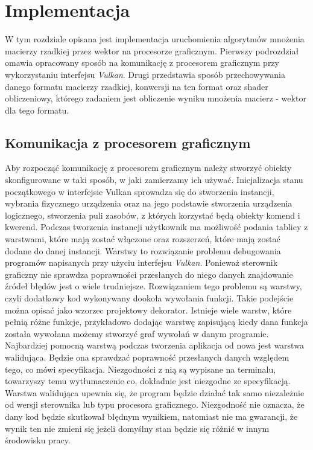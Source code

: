 \chapter{Implementacja}
\label{cha:implementacja}

W tym rozdziale opisana jest implementacja uruchomienia algorytmów mnożenia macierzy rzadkiej przez wektor na procesorze graficznym.
Pierwszy podrozdział omawia opracowany sposób na komunikację z procesorem graficznym przy wykorzystaniu interfejsu \textit{Vulkan}.
Drugi przedstawia sposób przechowywania danego formatu macierzy rzadkiej, konwersji na ten format oraz shader obliczeniowy, którego zadaniem jest obliczenie wyniku mnożenia macierz - wektor dla tego formatu.

\section{Komunikacja z procesorem graficznym}
\label{cha:graphics_comm}

Aby rozpocząć komunikację z procesorem graficznym należy stworzyć obiekty skonfigurowane w taki sposób, w jaki zamierzamy ich używać. 
Inicjalizacja stanu początkowego w interfejsie Vulkan sprowadza się do stworzenia instancji, wybrania fizycznego urządzenia oraz na jego podstawie stworzenia urządzenia logicznego, stworzenia puli zasobów, z których korzystać będą obiekty komend i kwerend.
Podczas tworzenia instancji użytkownik ma możliwość podania tablicy z warstwami, które mają zostać włączone oraz rozszerzeń, które mają zostać dodane do danej instancji. 
Warstwy to rozwiązanie problemu debugowania programów napisanych przy użyciu interfejsu \textit{Vulkan}.
Ponieważ sterownik graficzny nie sprawdza poprawności przesłanych do niego danych znajdowanie źródeł błędów jest o wiele trudniejsze.
Rozwiązaniem tego problemu są warstwy, czyli dodatkowy kod wykonywany dookoła wywołania funkcji. 
Takie podejście można opisać jako wzorzec projektowy dekorator.
Istnieje wiele warstw, które pełnią różne funkcje, przykładowo dodając warstwę zapisującą kiedy dana funkcja została wywołana możemy stworzyć graf wywołań w danym programie.
Najbardziej pomocną warstwą podczas tworzenia aplikacja od nowa jest warstwa walidująca.
Będzie ona sprawdzać poprawność przesłanych danych względem tego, co mówi specyfikacja.
Niezgodności z nią są wypisane na terminalu, towarzyszy temu wytłumaczenie co, dokładnie jest niezgodne ze specyfikacją.
Warstwa walidująca upewnia się, że program będzie działać tak samo niezależnie od wersji sterownika lub typu procesora graficznego.
Niezgodność nie oznacza, że dany kod będzie skutkował błędnym wynikiem, natomiast nie ma gwarancji, że wynik ten nie zmieni się jeżeli domyślny stan będzie się różnić w innym środowisku pracy. 

